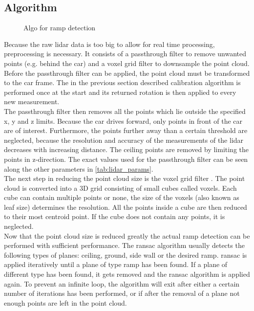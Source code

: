 \subsection{Algorithm}
\begin{figure}[htb]
	\centering
	
	\caption{Algo for ramp detection}
	\label{fig:flowchart_lidar}
\end{figure}
Because the raw \gls{lidar} data is too big to allow for real time processing, preprocessing is necessary.
It consists of a passthrough filter to remove unwanted points (e.g. behind the car) and a voxel grid filter to downsample the point cloud.
Before the passthrough filter can be applied, the point cloud must be transformed to the car frame.
The in the previous section described calibration algorithm is performed once at the start and its returned rotation is then applied to every new measurement.\\
The passthrough filter then removes all the points which lie outside the specified x, y and z limits.
Because the car drives forward, only points in front of the car are of interest.
Furthermore, the points further away than a certain threshold are neglected, because the resolution and accuracy of the measurements of the \gls{lidar} decreases with increasing distance.
The ceiling points are removed by limiting the points in z-direction.
The exact values used for the passthrough filter can be seen along the other parameters in \cref{tab:lidar_params}.\\
The next step in reducing the point cloud size is the voxel grid filter \cite{Vosselman2004}.
The point cloud is converted into a 3D grid consisting of small cubes called voxels.
Each cube can contain multiple points or none, the size of the voxels (also known as leaf size) determines the resolution.
All the points inside a cube are then reduced to their most centroid point.
If the cube does not contain any points, it is neglected.\\
Now that the point cloud size is reduced greatly the actual ramp detection can be performed with sufficient performance.
The \gls{ransac} algorithm usually detects the following types of planes: ceiling, ground, side wall or the desired ramp.
\gls{ransac} is applied iteratively until a plane of type ramp has been found.
If a plane of different type has been found, it gets removed and the \gls{ransac} algorithm is applied again.
To prevent an infinite loop, the algorithm will exit after either a certain number of iterations has been performed, or if after the removal of a plane not enough points are left in the point cloud.\\
